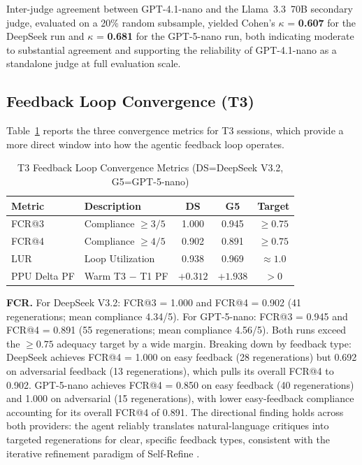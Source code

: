 \documentclass[conference]{IEEEtran}
\begin{document}
Inter-judge agreement between GPT-4.1-nano and the Llama~3.3~70B secondary judge, evaluated on a 20\% random subsample, yielded Cohen's $\kappa$ = \textbf{0.607} for the DeepSeek run and $\kappa$ = \textbf{0.681} for the GPT-5-nano run, both indicating moderate to substantial agreement and supporting the reliability of GPT-4.1-nano as a standalone judge at full evaluation scale.

\subsection{Feedback Loop Convergence (T3)}

Table~\ref{tab:convergence} reports the three convergence metrics for T3 sessions, which provide a more direct window into how the agentic feedback loop operates.

\begin{table}[htbp]
\caption{T3 Feedback Loop Convergence Metrics (DS=DeepSeek V3.2, G5=GPT-5-nano)}
\label{tab:convergence}
\begin{center}
\scriptsize
\setlength{\tabcolsep}{6pt}
\begin{tabular}{llccc}
\toprule
\textbf{Metric} & \textbf{Description} & \textbf{DS} & \textbf{G5} & \textbf{Target} \\
\midrule
FCR@3 & Compliance $\geq 3/5$ & 1.000 & 0.945 & $\geq 0.75$ \\
FCR@4 & Compliance $\geq 4/5$ & 0.902 & 0.891 & $\geq 0.75$ \\
LUR   & Loop Utilization     & 0.938 & 0.969 & $\approx 1.0$ \\
PPU Delta PF & Warm T3 $-$ T1 PF & $+0.312$ & $+1.938$ & $> 0$ \\
\bottomrule
\end{tabular}
\end{center}
\end{table}

\textbf{FCR.} For DeepSeek V3.2: FCR@3 = 1.000 and FCR@4 = 0.902 (41 regenerations; mean compliance 4.34/5). For GPT-5-nano: FCR@3 = 0.945 and FCR@4 = 0.891 (55 regenerations; mean compliance 4.56/5). Both runs exceed the $\geq 0.75$ adequacy target by a wide margin. Breaking down by feedback type: DeepSeek achieves FCR@4 = 1.000 on easy feedback (28 regenerations) but 0.692 on adversarial feedback (13 regenerations), which pulls its overall FCR@4 to 0.902. GPT-5-nano achieves FCR@4 = 0.850 on easy feedback (40 regenerations) and 1.000 on adversarial (15 regenerations), with lower easy-feedback compliance accounting for its overall FCR@4 of 0.891. The directional finding holds across both providers: the agent reliably translates natural-language critiques into targeted regenerations for clear, specific feedback types, consistent with the iterative refinement paradigm of Self-Refine \cite{b12}.
\end{document}
